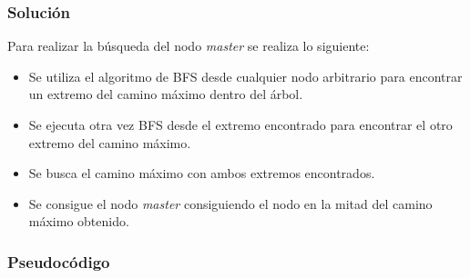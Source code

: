 \documentclass[a4paper, 10pt, twoside]{article}
\begin{document}
\subsubsection{Solución}

Para realizar la búsqueda del nodo \textit{master} se realiza lo siguiente:

\begin{itemize}
\item Se utiliza el algoritmo de BFS desde cualquier nodo arbitrario para encontrar un extremo del camino máximo dentro del árbol.
\item Se ejecuta otra vez BFS desde el extremo encontrado para encontrar el otro extremo del camino máximo.
\item Se busca el camino máximo con ambos extremos encontrados.
\item Se consigue el nodo \textit{master} consiguiendo el nodo en la mitad del camino máximo obtenido.
\end{itemize}

\subsubsection{Pseudocódigo}
\end{document}
